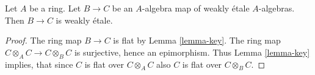 \begin{lemma}
\label{lemma-weakly-etale-permanence}
Let $A$ be a ring. Let $B \to C$ be an $A$-algebra map of weakly \'etale
$A$-algebras. Then $B \to C$ is weakly \'etale.
\end{lemma}

\begin{proof}
The ring map $B \to C$ is flat by Lemma \ref{lemma-key}. The ring map
$C \otimes_A C \to C \otimes_B C$ is surjective, hence an epimorphism.
Thus Lemma \ref{lemma-key} implies, that since $C$ is flat over
$C \otimes_A C$ also $C$ is flat over $C \otimes_B C$.
\end{proof}
